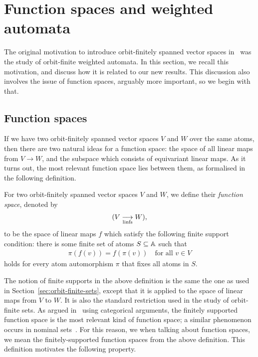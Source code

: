 \section{Function spaces and  weighted automata}\label{sec:duals}

The original motivation to introduce orbit-finitely spanned vector spaces in~\cite{BFKM24} was the study of orbit-finite weighted automata. In this section, we recall this motivation, and discuss how it is related to our new results. This discussion also involves  the issue of function spaces, arguably more important, so we begin with that.
 
\subsection{Function spaces} If we have two orbit-finitely spanned vector spaces $V$ and $W$ over the same atoms, then there are two natural ideas for a function space: the space of all linear maps from $V \to W$, and the subspace which consists of equivariant linear maps. As it turns out, the most relevant function space lies between them, as formalised in the following definition.


\begin{definition}\label{def:function-space}
    For two orbit-finitely spanned vector spaces $V$ and $W$, we define their \emph{function space}, denoted by 
    \begin{align*}
     (V \underset{\textup{linfs}}{\longrightarrow} W),
    \end{align*}
    to be the space of linear maps $f$ which satisfy the following {finite support condition}: there is some finite set of atoms $S \subseteq \mathbb{A}$ such that
    \begin{align*}
    \pi(f(v)) = f(\pi(v)) \quad \text{for all $v \in V$}
    \end{align*}
     holds for every atom automorphism $\pi$ that fixes all atoms in $S$.
\end{definition}

The notion of finite supports in the above definition is the same  the one as used in Section~\ref{sec:orbit-finite-sets}, except that it is applied to the space of linear maps from $V$ to $W$. It is also the standard restriction used in the study of orbit-finite sets. As argued in~\cite[Sec. 8.3]{bojanczyk_slightly} using categorical arguments, the finitely supported function space is the most relevant kind of function space; a similar phenomenon occurs in nominal sets~\cite[Thm. 3.13]{PittsAM:nomsns}. For this reason, we when talking about function spaces, we mean the finitely-supported function spaces from the above definition.  This definition motivates the following property.

